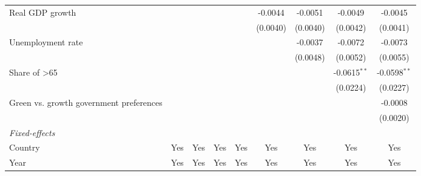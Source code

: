 \begin{table}[htbp]
\begin{tabular}{lcccccccc}
      Real GDP growth                                                                   &          &          &                &                & -0.0044         & -0.0051         & -0.0049        & -0.0045\\   
                                                                                        &          &          &                &                & (0.0040)        & (0.0040)        & (0.0042)       & (0.0041)\\   
      Unemployment rate                                                                 &          &          &                &                &                 & -0.0037         & -0.0072        & -0.0073\\   
                                                                                        &          &          &                &                &                 & (0.0048)        & (0.0052)       & (0.0055)\\   
      Share of >65                                                                      &          &          &                &                &                 &                 & -0.0615$^{**}$ & -0.0598$^{**}$\\   
                                                                                        &          &          &                &                &                 &                 & (0.0224)       & (0.0227)\\   
      Green vs. growth government preferences                                           &          &          &                &                &                 &                 &                & -0.0008\\   
                                                                                        &          &          &                &                &                 &                 &                & (0.0020)\\   
      \midrule
      \emph{Fixed-effects}\\
      Country                                                                           & Yes      & Yes      & Yes            & Yes            & Yes             & Yes             & Yes            & Yes\\  
      Year                                                                              & Yes      & Yes      & Yes            & Yes            & Yes             & Yes             & Yes            & Yes\\  

\end{tabular}
\end{table}
